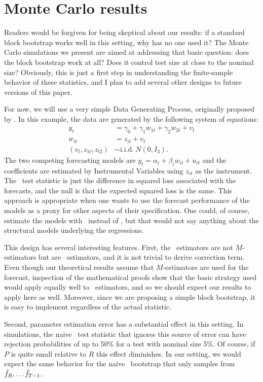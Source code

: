 \documentclass[12pt,fleqn]{article}
\begin{document}
\section{Monte Carlo results}\label{sec:mc}

Readers would be forgiven for being skeptical about our results: if a
standard block bootstrap works well in this setting, why has no one
used it? The Monte Carlo simulations we present are aimed at
addressing that basic question: does the block bootstrap work at all?
Does it control test size at close to the nominal size? Obviously,
this is just a first step in understanding the finite-sample behavior
of these statistics, and I plan to add several other designs to future
versions of this paper.

For now, we will use a very simple Data Generating Process, originally
proposed by \cite{Wes:96}. In this example, the data are generated by
the following system of equations:
\begin{align*}
  y_t &= \gamma_0 + \gamma_1 w_{1t} + \gamma_2 w_{2t} + v_t \\
  w_{it} &= z_{it} + v_t \\
  (v_t, z_{1t}, z_{t2}) &\sim \text{i.i.d.}\ N(0, I_3).
\end{align*}
The two competing forecasting models are $y_t = \alpha_i + \beta_i
w_{it} + u_{it}$ and the coefficients are estimated by Instrumental
Variables using $z_{it}$ as the instrument. The \oos\ test statistic
is just the difference in squared loss associated with the forecasts,
and the null is that the expected squared loss is the same.  This
approach is appropriate when one wants to use the forecast performance
of the models as a proxy for other aspects of their specification. One
could, of course, estimate the models with \ols\ instead of \iv, but
that would not say anything about the structural models underlying the
regressions.

This design has several interesting features. First, the \iv\
estimators are not $M$-estimators but are \gmm\ estimators, and it is
not trivial to derive \citepos{CoS:07} correction term. Even though
our theoretical results assume that $M$-estimators are used for the
forecast, inspection of the mathematical proofs show that the basic
strategy used would apply equally well to \gmm\ estimators, and so we
should expect our results to apply here as well. Moreover, since we
are proposing a simple block bootstrap, it is easy to implement
regardless of the actual statistic.

Second, parameter estimation error has a substantial effect in this
setting. In \citepos{Wes:96} simulations, the naive \oos\ test
statistic that ignores this source of error can have rejection
probabilities of up to 50\% for a test with nominal size 5\%. Of
course, if $P$ is quite small relative to $R$ this effect
diminishes. In our setting, we would expect the same behavior for the
naive \oos\ bootstrap that only samples from $\hat f_R,\dots\hat f_{T-1}$.
\end{document}
